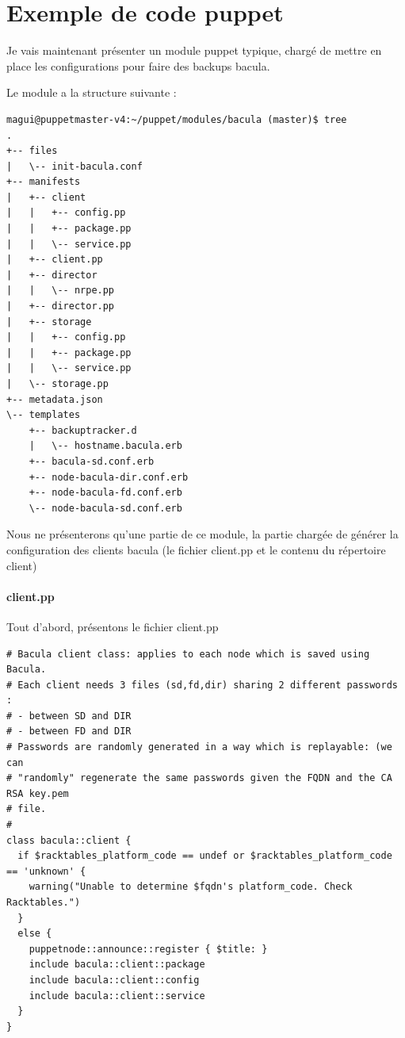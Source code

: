 \documentclass[14 pt,a4paper]{extreport}
\begin{document}
\appendix
\chapter{Exemple de code puppet}

Je vais maintenant présenter un module puppet typique, chargé de mettre en place les configurations pour faire des backups bacula.

Le module a la structure suivante :

\begin{Verbatim}[fontsize=\scriptsize]
magui@puppetmaster-v4:~/puppet/modules/bacula (master)$ tree
.
+-- files
|   \-- init-bacula.conf
+-- manifests
|   +-- client
|   |   +-- config.pp
|   |   +-- package.pp
|   |   \-- service.pp
|   +-- client.pp
|   +-- director
|   |   \-- nrpe.pp
|   +-- director.pp
|   +-- storage
|   |   +-- config.pp
|   |   +-- package.pp
|   |   \-- service.pp
|   \-- storage.pp
+-- metadata.json
\-- templates
    +-- backuptracker.d
    |   \-- hostname.bacula.erb
    +-- bacula-sd.conf.erb
    +-- node-bacula-dir.conf.erb
    +-- node-bacula-fd.conf.erb
    \-- node-bacula-sd.conf.erb
\end{Verbatim}

Nous ne présenterons qu'une partie de ce module, la partie chargée de générer la configuration des clients bacula (le fichier client.pp et le contenu du répertoire client)

\subsubsection*{client.pp}

Tout d'abord, présentons le fichier client.pp

\begin{framed}
\begin{Verbatim}[fontsize=\scriptsize]
# Bacula client class: applies to each node which is saved using Bacula.
# Each client needs 3 files (sd,fd,dir) sharing 2 different passwords :
# - between SD and DIR
# - between FD and DIR
# Passwords are randomly generated in a way which is replayable: (we can
# "randomly" regenerate the same passwords given the FQDN and the CA RSA key.pem
# file.
#
class bacula::client {
  if $racktables_platform_code == undef or $racktables_platform_code == 'unknown' {
    warning("Unable to determine $fqdn's platform_code. Check Racktables.")
  }
  else {
    puppetnode::announce::register { $title: }
    include bacula::client::package
    include bacula::client::config
    include bacula::client::service
  }
}\end{Verbatim}
\end{framed}
\end{document}
